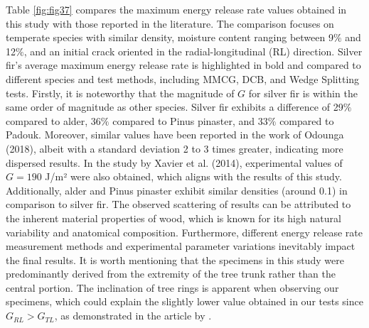 \documentclass[3p,times,procedia]{elsarticle}
\begin{document}
Table \ref{fig:fig37} compares the maximum energy release rate values obtained in this study with those reported in the literature. The comparison focuses on temperate species with similar density, moisture content ranging between 9$\%$ and 12$\%$, and an initial crack oriented in the radial-longitudinal (RL) direction. Silver fir's average maximum energy release rate is highlighted in bold and compared to different species and test methods, including MMCG, DCB, and Wedge Splitting tests.
Firstly, it is noteworthy that the magnitude of $G$ for silver fir is within the same order of magnitude as other species. Silver fir exhibits a difference of 29$\%$ compared to alder, 36$\%$ compared to Pinus pinaster, and 33$\%$ compared to Padouk. Moreover, similar values have been reported in the work of Odounga (2018), albeit with a standard deviation 2 to 3 times greater, indicating more dispersed results.
In the study by Xavier et al. (2014), experimental values of $G=190$ J/m² were also obtained, which aligns with the results of this study. Additionally, alder and Pinus pinaster exhibit similar densities (around 0.1) in comparison to silver fir.
The observed scattering of results can be attributed to the inherent material properties of wood, which is known for its high natural variability and anatomical composition. Furthermore, different energy release rate measurement methods and experimental parameter variations inevitably impact the final results.
It is worth mentioning that the specimens in this study were predominantly derived from the extremity of the tree trunk rather than the central portion. The inclination of tree rings is apparent when observing our specimens, which could explain the slightly lower value obtained in our tests since $G_{RL} > G_{TL}$, as demonstrated in the article by \citep{Reiterer2002}.
\end{document}
